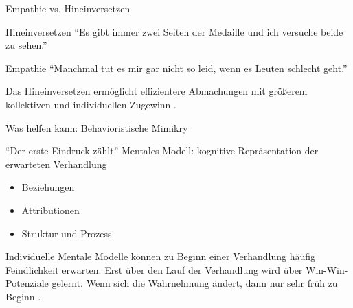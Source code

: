 \begin{frame}{Empathie vs. Hineinversetzen}

  \begin{block}{Hineinversetzen}
    \enquote{Es gibt immer zwei Seiten der Medaille und ich versuche beide zu sehen.}
  \end{block}
  \begin{block}{Empathie}
    \enquote{Manchmal tut es mir gar nicht so leid, wenn es Leuten schlecht geht.}
  \end{block}

  Das Hineinversetzen ermöglicht effizientere Abmachungen mit größerem kollektiven und individuellen Zugewinn \cite{galinsky_why_2008}.

  
  Was helfen kann: Behavioristische Mimikry \cite[][p. 500]{thompson_negotiation_2010}
\end{frame}

\begin{frame}{\enquote{Der erste Eindruck zählt}}
  Mentales Modell: kognitive Repräsentation der erwarteten Verhandlung \cite[][p. 287ff]{bazerman_negotiation_2000}
  \begin{itemize}
	\item Beziehungen
	\item Attributionen
	\item Struktur und Prozess
  \end{itemize}
  
	  Individuelle Mentale Modelle können zu Beginn einer Verhandlung häufig Feindlichkeit erwarten.
      Erst über den Lauf der Verhandlung wird über Win-Win-Potenziale gelernt. Wenn sich die Wahrnehmung ändert, dann nur sehr früh zu Beginn \cite{thompson_social_1990}
	  \cite[][p. 287ff]{bazerman_negotiation_2000}. 

\end{frame}


